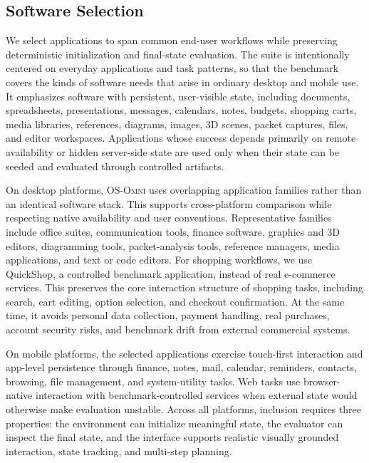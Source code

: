 \subsection{Software Selection}
\label{app:software_selection}
We select applications to span common end-user workflows while preserving deterministic initialization and final-state evaluation. The suite is intentionally centered on everyday applications and task patterns, so that the benchmark covers the kinds of software needs that arise in ordinary desktop and mobile use. It emphasizes software with persistent, user-visible state, including documents, spreadsheets, presentations, messages, calendars, notes, budgets, shopping carts, media libraries, references, diagrams, images, 3D scenes, packet captures, files, and editor workspaces. Applications whose success depends primarily on remote availability or hidden server-side state are used only when their state can be seeded and evaluated through controlled artifacts.

On desktop platforms, \textsc{OS-Omni} uses overlapping application families rather than an identical software stack. This supports cross-platform comparison while respecting native availability and user conventions. Representative families include office suites, communication tools, finance software, graphics and 3D editors, diagramming tools, packet-analysis tools, reference managers, media applications, and text or code editors. For shopping workflows, we use QuickShop, a controlled benchmark application, instead of real e-commerce services. This preserves the core interaction structure of shopping tasks, including search, cart editing, option selection, and checkout confirmation. At the same time, it avoids personal data collection, payment handling, real purchases, account security risks, and benchmark drift from external commercial systems.

On mobile platforms, the selected applications exercise touch-first interaction and app-level persistence through finance, notes, mail, calendar, reminders, contacts, browsing, file management, and system-utility tasks. Web tasks use browser-native interaction with benchmark-controlled services when external state would otherwise make evaluation unstable. Across all platforms, inclusion requires three properties: the environment can initialize meaningful state, the evaluator can inspect the final state, and the interface supports realistic visually grounded interaction, state tracking, and multi-step planning.

